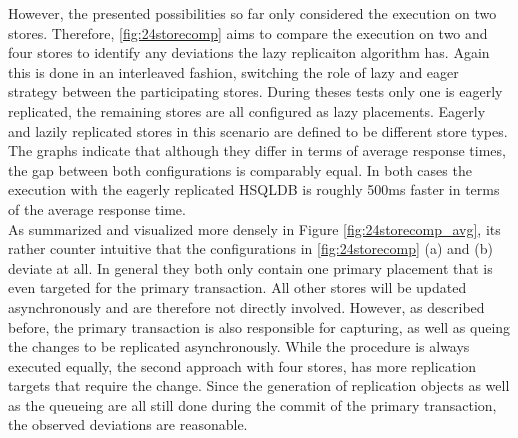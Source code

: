 
However, the presented possibilities so far only considered the execution on two stores. Therefore, \ref{fig:24storecomp} aims
to compare the execution on two and four stores to identify any deviations the lazy replicaiton algorithm has. 
Again this is done in an interleaved fashion, switching the role of lazy and eager strategy between the participating stores.
During theses tests only one is eagerly replicated, the remaining stores are all configured as lazy placements. Eagerly and lazily replicated stores
in this scenario are defined to be different store types.\\
The graphs indicate that although they differ in terms of average response times, the gap between both configurations is comparably equal.
In both cases the execution with the eagerly replicated HSQLDB is roughly 500ms faster in terms of the average response time.\\

As summarized and visualized more densely in Figure \ref{fig:24storecomp_avg},
its rather counter intuitive that the configurations in \ref{fig:24storecomp} (a) and (b) deviate at all. 
In general they both only contain one primary placement that is even targeted for the primary transaction.
All other stores will be updated asynchronously and are therefore not directly involved.
However, as described before, the primary transaction is also responsible for capturing, as well as queing the changes to be replicated asynchronously.
While the procedure is always executed equally, the second approach with four stores, has more replication targets that require the change. 
Since the generation of replication objects as well as the queueing are all still done during the commit of the primary transaction, the observed
deviations are reasonable.\\

